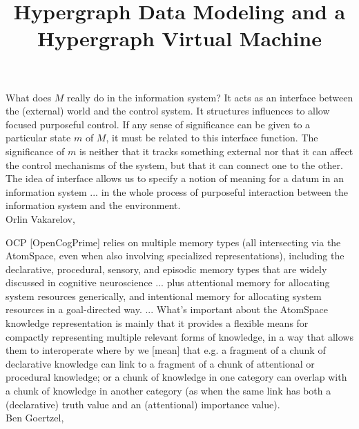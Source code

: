 \documentclass[11pt,twocolumn]{article}
\begin{document}
\title{Hypergraph Data Modeling and a Hypergraph Virtual Machine}
\newsavebox{\qboxi}
\newsavebox{\qboxii}
\newsavebox{\qboxiii}
\begin{lrbox}{\qboxi}
\begin{frquote}What does $M$ really do in the information system?  It acts as
an interface between the (external) world and the control 
system.  It structures influences to allow focused purposeful
control.  If any sense of significance can be given
to a particular state $m$ of $M$, it must be related
to this interface function.  The
significance of $m$ is neither that it
tracks something external nor
that it can affect the
control mechanisms of the system,
but that it can connect one to the
other.  The idea of interface allows
us to specify a notion of meaning for a datum
in an information system ... in the whole process
of purposeful interaction between the information system and the environment.
\\ \longdash{} Orlin Vakarelov, \cite[p. 15-16]{OrlinVakarelov}{}
\end{frquote}
\end{lrbox}	
\begin{lrbox}{\qboxii}
\begin{frquote}OCP [OpenCogPrime] relies on multiple memory types 
(all intersecting via the AtomSpace, even when also involving 
specialized representations), including the declarative, procedural, sensory, 
and episodic memory types that are widely discussed in cognitive 
neuroscience ... plus attentional memory for allocating system resources
generically, and intentional memory for allocating system resources in 
a goal-directed way.  ...
What's important about the AtomSpace knowledge representation is mainly 
that it provides a flexible means for compactly representing multiple relevant forms 
of knowledge, in a way that allows them to interoperate \mdash{} 
where by  we [mean] that e.g. a 
fragment of a chunk of declarative knowledge can link
to a fragment of a chunk of attentional or procedural knowledge; 
or a chunk of knowledge in one category
can overlap with a chunk of knowledge in another category (as when the same link has both a (declarative) truth value and an 
(attentional) importance value).  
\\ \longdash{} Ben Goertzel, \cite[pp. 4-5]{GoertzelSS}{}
\end{frquote}
\end{lrbox}	
\end{document}
